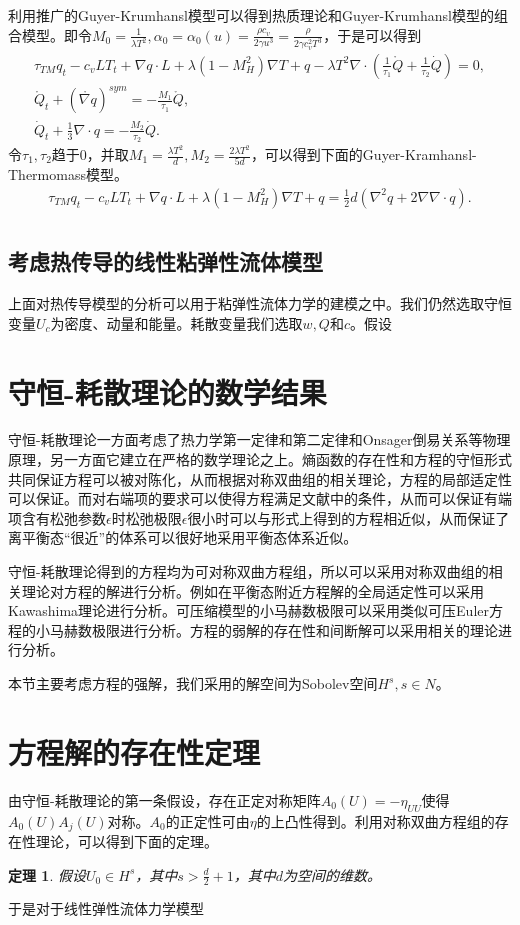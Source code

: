 \documentclass{article}
\newtheorem{theorem}{定理}
\begin{document}
利用推广的Guyer-Krumhansl模型可以得到热质理论和Guyer-Krumhansl模型的组合模型。即令$M_0=\frac{1}{\lambda T^2}, \alpha_0 = \alpha_0 (u) =\frac{\rho c_v}{2\gamma u^3}=\frac{\rho}{2\gamma c_v^2 T^3}$，于是可以得到
\begin{eqnarray*}
\tau_{TM} {q}_t-c_v {L}T_t+\nabla {q} \cdot {L}+\lambda(1-M_H^2)\nabla T+{q} - \lambda T^2 \nabla \cdot ({\frac{1}{\tau_1} \mathring{{Q}}}+\frac{1}{\tau_2}\dot{Q})=0, \\
\mathring{{Q}}_t+(\mathring{\nabla {q}})^{sym}=-\frac{M_1}{\tau_1}\mathring{{Q}}, \\
\dot{Q}_t+\frac{1}{3} \nabla \cdot {q}=-\frac{M_2}{\tau_2} \dot{Q}.
\end{eqnarray*}
令$\tau_1,\tau_2$趋于0，并取$M_1 = \frac{\lambda T^2}{d}, M_2 = \frac{2\lambda T^2}{5 d }$，可以得到下面的Guyer-Kramhansl-Thermomass模型。
\begin{eqnarray*}
	\tau_{TM} {q}_t-c_v {L}T_t+\nabla {q} \cdot {L}+\lambda(1-M_H^2)\nabla T+{q} = \frac{1}{2}d (\nabla^2 q +2 \nabla \nabla \cdot q). \\
\end{eqnarray*}


\subsection{考虑热传导的线性粘弹性流体模型}
上面对热传导模型的分析可以用于粘弹性流体力学的建模之中。我们仍然选取守恒变量$U_c$为密度、动量和能量。耗散变量我们选取$w,Q$和$c$。假设



	\section{守恒-耗散理论的数学结果}
	守恒-耗散理论一方面考虑了热力学第一定律和第二定律和Onsager倒易关系等物理原理，另一方面它建立在严格的数学理论之上。熵函数的存在性和方程的守恒形式共同保证方程可以被对陈化，从而根据对称双曲组的相关理论，方程的局部适定性可以保证。而对右端项的要求可以使得方程满足文献\cite{}中的条件，从而可以保证有端项含有松弛参数$\epsilon$时松弛极限$\epsilon$很小时可以与形式上得到的方程相近似，从而保证了离平衡态“很近”的体系可以很好地采用平衡态体系近似。

	守恒-耗散理论得到的方程均为可对称双曲方程组，所以可以采用对称双曲组的相关理论对方程的解进行分析。例如在平衡态附近方程解的全局适定性可以采用Kawashima理论进行分析\cite{}。可压缩模型的小马赫数极限可以采用类似可压Euler方程的小马赫数极限进行分析\cite{}。方程的弱解的存在性和间断解可以采用相关的理论进行分析\cite{}。

	本节主要考虑方程的强解，我们采用的解空间为Sobolev空间$H^s, s \in N$。

	\section{方程解的存在性定理}
	由守恒-耗散理论的第一条假设，存在正定对称矩阵$A_0(U)  = -\eta_{UU}$使得$A_0(U) A_j(U)$对称。$A_0$的正定性可由$\eta$的上凸性得到。利用对称双曲方程组的存在性理论，可以得到下面的定理\cite{}。
	\begin{theorem}
		假设$U_0 \in H^{s}$，其中$s>\frac{d}{2} +1$，其中$d$为空间的维数。
	\end{theorem}
	于是对于线性弹性流体力学模型
	
\end{document}
